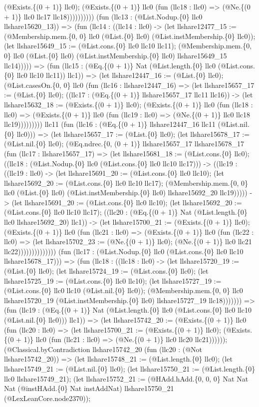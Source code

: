 \documentclass[11pt]{article}
\begin{document}
(@Exists.\{(0 + 1)\} llc0); (@Exists.\{(0 + 1)\} llc0 (fun (llc18 : llc0) => (@Ne.\{(0 + 1)\} llc0 llc17 llc18)))))))))) (fun (llc13 : (@List.Nodup.\{0\} llc0 llshare15620\_13)) => (fun (llc14 : ((llc14 : llc0) -> (let llshare12477\_15 := (@Membership.mem.\{0, 0\} llc0 (@List.\{0\} llc0) (@List.instMembership.\{0\} llc0)); (let llshare15649\_15 := (@List.cons.\{0\} llc0 llc10 llc11); (@Membership.mem.\{0, 0\} llc0 (@List.\{0\} llc0) (@List.instMembership.\{0\} llc0) llshare15649\_15 llc14))))) => (fun (llc15 : (@Eq.\{(0 + 1)\} Nat (@List.length.\{0\} llc0 (@List.cons.\{0\} llc0 llc10 llc11)) llc1)) => (let llshare12447\_16 := (@List.\{0\} llc0); (@List.casesOn.\{0, 0\} llc0 (fun (llc16 : llshare12447\_16) => (let llshare15657\_17 := (@List.\{0\} llc0); ((llc17 : (@Eq.\{(0 + 1)\} llshare15657\_17 llc11 llc16)) -> (let llshare15632\_18 := (@Exists.\{(0 + 1)\} llc0); (@Exists.\{(0 + 1)\} llc0 (fun (llc18 : llc0) => (@Exists.\{(0 + 1)\} llc0 (fun (llc19 : llc0) => (@Ne.\{(0 + 1)\} llc0 llc18 llc19))))))))) llc11 (fun (llc16 : (@Eq.\{(0 + 1)\} llshare12447\_16 llc11 (@List.nil.\{0\} llc0))) => (let llshare15657\_17 := (@List.\{0\} llc0); (let llshare15678\_17 := (@List.nil.\{0\} llc0); (@Eq.ndrec.\{0, (0 + 1)\} llshare15657\_17 llshare15678\_17 (fun (llc17 : llshare15657\_17) => (let llshare15681\_18 := (@List.cons.\{0\} llc0); ((llc18 : (@List.Nodup.\{0\} llc0 (@List.cons.\{0\} llc0 llc10 llc17))) -> ((llc19 : ((llc19 : llc0) -> (let llshare15691\_20 := (@List.cons.\{0\} llc0 llc10); (let llshare15692\_20 := (@List.cons.\{0\} llc0 llc10 llc17); (@Membership.mem.\{0, 0\} llc0 (@List.\{0\} llc0) (@List.instMembership.\{0\} llc0) llshare15692\_20 llc19))))) -> (let llshare15691\_20 := (@List.cons.\{0\} llc0 llc10); (let llshare15692\_20 := (@List.cons.\{0\} llc0 llc10 llc17); ((llc20 : (@Eq.\{(0 + 1)\} Nat (@List.length.\{0\} llc0 llshare15692\_20) llc1)) -> (let llshare15700\_21 := (@Exists.\{(0 + 1)\} llc0); (@Exists.\{(0 + 1)\} llc0 (fun (llc21 : llc0) => (@Exists.\{(0 + 1)\} llc0 (fun (llc22 : llc0) => (let llshare15702\_23 := (@Ne.\{(0 + 1)\} llc0); (@Ne.\{(0 + 1)\} llc0 llc21 llc22)))))))))))))) (fun (llc17 : (@List.Nodup.\{0\} llc0 (@List.cons.\{0\} llc0 llc10 llshare15678\_17))) => (fun (llc18 : ((llc18 : llc0) -> (let llshare15720\_19 := (@List.\{0\} llc0); (let llshare15724\_19 := (@List.cons.\{0\} llc0); (let llshare15725\_19 := (@List.cons.\{0\} llc0 llc10); (let llshare15727\_19 := (@List.cons.\{0\} llc0 llc10 (@List.nil.\{0\} llc0)); (@Membership.mem.\{0, 0\} llc0 llshare15720\_19 (@List.instMembership.\{0\} llc0) llshare15727\_19 llc18))))))) => (fun (llc19 : (@Eq.\{(0 + 1)\} Nat (@List.length.\{0\} llc0 (@List.cons.\{0\} llc0 llc10 (@List.nil.\{0\} llc0))) llc1)) => (let llshare15742\_20 := (@Exists.\{(0 + 1)\} llc0 (fun (llc20 : llc0) => (let llshare15700\_21 := (@Exists.\{(0 + 1)\} llc0); (@Exists.\{(0 + 1)\} llc0 (fun (llc21 : llc0) => (@Ne.\{(0 + 1)\} llc0 llc20 llc21)))))); (@Classical.byContradiction llshare15742\_20 (fun (llc20 : (@Not llshare15742\_20)) => (let llshare15748\_21 := (@List.length.\{0\} llc0); (let llshare15749\_21 := (@List.nil.\{0\} llc0); (let llshare15750\_21 := (@List.length.\{0\} llc0 llshare15749\_21); (let llshare15752\_21 := (@HAdd.hAdd.\{0, 0, 0\} Nat Nat Nat (@instHAdd.\{0\} Nat instAddNat) llshare15750\_21 (@LexLeanCore.node2370)); 
\end{document}
